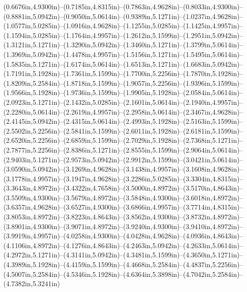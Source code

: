 (0.6676in,4.9300in)--(0.7185in,4.8315in)--(0.7863in,4.9628in)--(0.8033in,4.9300in)--(0.8881in,5.0942in)--(0.9050in,5.0614in)--(0.9389in,5.1271in)--(1.0237in,4.9628in)--(1.0577in,5.0285in)--(1.0916in,4.9628in)--(1.1255in,5.0285in)--(1.1425in,4.9957in)--(1.1594in,5.0285in)--(1.1764in,4.9957in)--(1.2612in,5.1599in)--(1.2951in,5.0942in)--(1.3121in,5.1271in)--(1.3290in,5.0942in)--(1.3460in,5.1271in)--(1.3799in,5.0614in)--(1.3969in,5.0942in)--(1.4478in,4.9957in)--(1.5156in,5.1271in)--(1.5495in,5.0614in)--(1.5835in,5.1271in)--(1.6174in,5.0614in)--(1.6513in,5.1271in)--(1.6683in,5.0942in)--(1.7191in,5.1928in)--(1.7361in,5.1599in)--(1.7700in,5.2256in)--(1.7870in,5.1928in)--(1.8209in,5.2584in)--(1.8718in,5.1599in)--(1.9057in,5.2256in)--(1.9396in,5.1599in)--(1.9566in,5.1928in)--(1.9736in,5.1599in)--(1.9905in,5.1928in)--(2.0584in,5.0614in)--(2.0923in,5.1271in)--(2.1432in,5.0285in)--(2.1601in,5.0614in)--(2.1940in,4.9957in)--(2.2280in,5.0614in)--(2.2619in,4.9957in)--(2.2958in,5.0614in)--(2.3467in,4.9628in)--(2.4145in,5.0942in)--(2.4315in,5.0614in)--(2.4993in,5.1928in)--(2.5163in,5.1599in)--(2.5502in,5.2256in)--(2.5841in,5.1599in)--(2.6011in,5.1928in)--(2.6181in,5.1599in)--(2.6520in,5.2256in)--(2.6859in,5.1599in)--(2.7029in,5.1928in)--(2.7368in,5.1271in)--(2.7877in,5.2256in)--(2.8386in,5.1271in)--(2.8555in,5.1599in)--(2.9064in,5.0614in)--(2.9403in,5.1271in)--(2.9573in,5.0942in)--(2.9912in,5.1599in)--(3.0421in,5.0614in)--(3.0590in,5.0942in)--(3.1269in,4.9628in)--(3.1438in,4.9957in)--(3.1608in,4.9628in)--(3.1778in,4.9957in)--(3.1947in,4.9628in)--(3.2286in,5.0285in)--(3.3304in,4.8315in)--(3.3643in,4.8972in)--(3.4322in,4.7658in)--(3.5000in,4.8972in)--(3.5170in,4.8643in)--(3.5509in,4.9300in)--(3.5679in,4.8972in)--(3.5848in,4.9300in)--(3.6018in,4.8972in)--(3.6357in,4.9628in)--(3.6527in,4.9300in)--(3.6866in,4.9957in)--(3.7714in,4.8315in)--(3.8053in,4.8972in)--(3.8223in,4.8643in)--(3.8562in,4.9300in)--(3.8732in,4.8972in)--(3.8901in,4.9300in)--(3.9071in,4.8972in)--(3.9240in,4.9300in)--(3.9410in,4.8972in)--(3.9919in,4.9957in)--(4.0258in,4.9300in)--(4.0428in,4.9628in)--(4.0936in,4.8643in)--(4.1106in,4.8972in)--(4.1276in,4.8643in)--(4.2463in,5.0942in)--(4.2633in,5.0614in)--(4.2972in,5.1271in)--(4.3141in,5.0942in)--(4.3481in,5.1599in)--(4.3650in,5.1271in)--(4.3989in,5.1928in)--(4.4159in,5.1599in)--(4.4668in,5.2584in)--(4.4837in,5.2256in)--(4.5007in,5.2584in)--(4.5346in,5.1928in)--(4.6364in,5.3898in)--(4.7042in,5.2584in)--(4.7382in,5.3241in) 